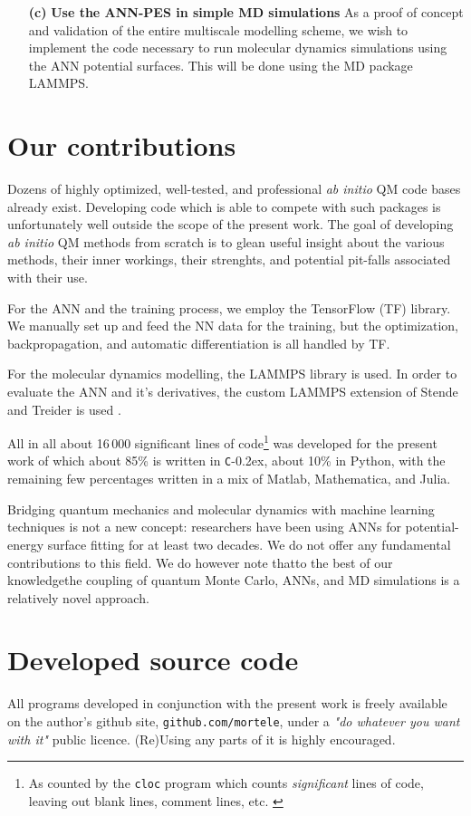\documentclass[twoside,english]{uiofysmaster}
\newcommand{\inlinecc}[1]{\lstinline[language={[std]c++}]{#1}}
\newcommand*\CC{\texttt{C}\kern-0.2ex\raisebox{0.2ex}{\scalebox{0.9}{+\kern-0.2ex+}}}
\begin{document}
\begin{itemize}
  \item[{\bf (c)}]{\bf Use the ANN-PES in simple MD simulations} \newline As a proof of concept and validation of the entire multiscale modelling scheme, we wish to implement the code necessary to run molecular dynamics simulations using the ANN potential surfaces.  This will be done using the MD package LAMMPS.
\end{itemize}

\section{Our contributions}
Dozens of highly optimized, well-tested, and professional \emph{ab initio} QM code bases already exist. Developing code which is able to compete with such packages is unfortunately well outside the scope of the present work. The goal of developing \emph{ab initio} QM methods from scratch is to glean useful insight about the various methods, their inner workings, their strenghts, and potential pit-falls associated with their use.
 
For the ANN and the training process, we employ the TensorFlow (TF) library. We manually set up and feed the NN data for the training, but the optimization, backpropagation, and automatic differentiation is all handled by TF.

For the molecular dynamics modelling, the LAMMPS library is used. In order to evaluate the ANN and it's derivatives, the custom LAMMPS extension of Stende and Treider is used \cite{stende,treider}. 

All in all about 16\,000 significant lines of code\footnote{As counted by the \lstinline{cloc} program which counts \emph{significant} lines of code, leaving out blank lines, comment lines, etc. \cite{cloc}} was developed for the present work of which about 85\% is written in \CC{}, about 10\% in Python, with the remaining few percentages written in a mix of {\sc Matlab}, Mathematica, and Julia. 

Bridging quantum mechanics and molecular dynamics with machine learning techniques is not a new concept: researchers have been using ANNs for potential-energy surface fitting for at least two decades. We do not offer any fundamental contributions to this field. We do however note that\textemdash to the best of our knowledge\textemdash the coupling of quantum Monte Carlo, ANNs, and MD simulations is a relatively novel approach. 

\section{Developed source code}
All programs developed in conjunction with the present work is freely available on the author's github site, \inlinecc{github.com/mortele}, under a \emph{"do whatever you want with it"} public licence. (Re)Using any parts of it is highly encouraged.
\end{document}
